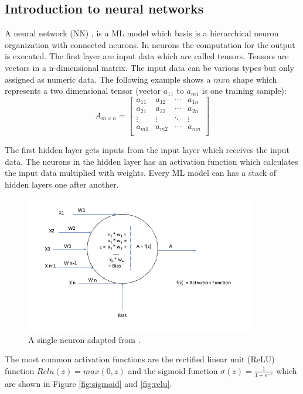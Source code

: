 \subsection{Introduction to neural networks}

A neural network (NN) \cite{Maas2013RectifierNI}, \cite{DBLP:journals/corr/ZhangZLS17} is a ML model which basis is a hierarchical neuron organization with connected neurons. In neurons the computation for the output is executed.
The first layer are input data which are called tensors. Tensors are vectors in a n-dimensional matrix. The input data can be various types but only assigned as numeric data. The following example shows a $m x n$ shape which represents a two dimensional tensor (vector $a_{11}$ to $a_{m1}$ is one training sample):
\[
  A_{m\times n} =
  \left[ {\begin{array}{cccc}
    a_{11} & a_{12} & \cdots & a_{1n}\\
    a_{21} & a_{22} & \cdots & a_{2n}\\
    \vdots & \vdots & \ddots & \vdots\\
    a_{m1} & a_{m2} & \cdots & a_{mn}\\
  \end{array} } \right]
\]

The first hidden layer gets inputs from the input layer which receives the input data. The neurons in the hidden layer has an activation function which calculates the input data multiplied with weights.
Every ML model can has a stack of hidden layers one after another.

\begin{figure}[ht!]
  \centering
  \includegraphics[width=10cm]{pictures/single_neuron.jpg}
  \caption{A single neuron adapted from \cite{moolayil_2019}.}
  \label{fig:single_neuron}
\end{figure}

The most common activation functions \cite{DBLP:conf/bmvc/Misra20} are the rectified linear unit (ReLU) function $Relu(z) = max(0, z)$ and the sigmoid function $\sigma(z) = \frac{1} {1 + e^{-z}}$ which are shown in Figure \ref{fig:sigmoid} and \ref{fig:relu}.

